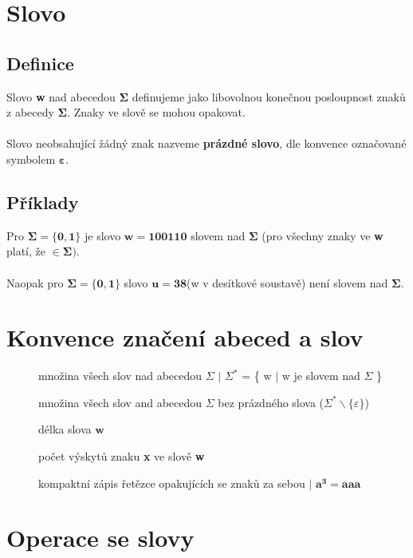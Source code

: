 \documentclass{report}
\begin{document}
\section{Slovo}
\subsection*{Definice}
Slovo \textbf{w} nad abecedou $\mathbf{\Sigma}$ definujeme jako libovolnou konečnou posloupnost znaků z abecedy $\mathbf{\Sigma}$.
Znaky ve slově se mohou opakovat. \\ \\
  Slovo neobsahující žádný znak nazveme \textbf{prázdné slovo}, dle konvence označované symbolem $\mathbf{\varepsilon}$.


\subsection*{Příklady}
Pro $\mathbf{\Sigma = \{0,1\}}$ je slovo $\mathbf{w = 100110}$ slovem nad $\mathbf{\Sigma}$ (pro všechny znaky ve \textbf{w} platí, že $\in\mathbf{\Sigma})$.
\\ \\
Naopak pro $\mathbf{\Sigma = \{0,1\}}$ slovo $\mathbf{u = 38 }$(w v desítkové soustavě) není slovem nad $\mathbf{\Sigma}$.

\section{Konvence značení abeced a slov}
\begin{description}
    \item[\fbox{$\Sigma^{*}$}] množina všech slov nad abecedou $\Sigma$  $\mid$ $\Sigma^{*}$ = \{ w $\mid$ w je slovem nad  $\Sigma$ \}
    \item[\fbox{$\Sigma^{+}$}]  množina všech slov and abecedou $\Sigma$ bez prázdného slova ($\Sigma^{*}\backslash \{\varepsilon\}$)
    \item[] délka slova $\mathbf{w}$
    \item[] počet výskytů znaku \textbf{x} ve slově \textbf{w}
    \item[] kompaktní zápis řetězce opakujících se znaků za sebou $\mid$  $\mathbf{a^{3} = aaa}$
\end{description}

\section{Operace se slovy}
\end{document}
